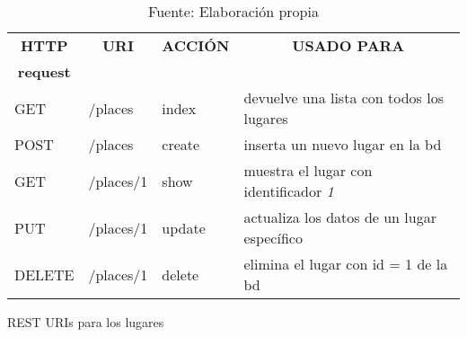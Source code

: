   \begin{table}[!hbp]
    \begin{center}

      \begin{tabularx}{0.75\textwidth}{ l l l  X }
        \toprule
        \multicolumn{1}{c}{\textbf{HTTP}} &
        \multicolumn{1}{c}{\textbf{URI}}  &
        \multicolumn{1}{c}{\textbf{ACCI\'ON}} &
        \multicolumn{1}{c}{\textbf{USADO PARA}}  \\
        \multicolumn{1}{c}{\textbf{request}} & & & \\

        \midrule
        GET     &  /places    &  index    & devuelve una lista con todos los lugares\\
        POST    &  /places    &  create   & inserta un nuevo lugar en la bd\\
        GET     &  /places/1  &  show     & muestra el lugar con identificador \emph{1}\\
        PUT     &  /places/1  &  update   & actualiza los datos de un lugar específico\\
        DELETE  &  /places/1  &  delete   & elimina el lugar con id = 1 de la bd\\
        \bottomrule
      \end{tabularx}

      \caption[recursos REST]{REST URIs para los lugares}
      \label{tab:rest}

      \caption*{Fuente: Elaboración propia}
    \end{center}
  \end{table}




